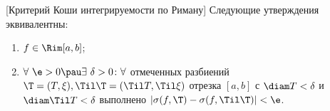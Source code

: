 [Критерий Коши интегрируемости по Риману] Следующие утверждения эквивалентны:
 \begin{enumerate}
   \item $f\in\Rim[a,b]$;
   \item $\forall\  \e>0\pau\exists\  \delta>0\colon\forall$ отмеченных разбиений $\T=(T,\xi), \Til\T=(\Til T,\Til\xi)$ отрезка $[a,b]$ с $\diam T<\delta$ и ${\diam\Til T<\delta}$ выполнено $|\sigma(f,\T)-\sigma(f,\Til\T)|<\e$.
 \end{enumerate}
 